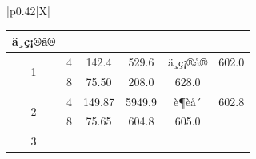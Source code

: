 \documentclass[UTF8,10pt,a4paper,fontset=fandol]{ctexart}
\newcommand{\fieldvalue}[1]{#1}
\newcommand{\handwritten}[1]{#1}
\begin{document}
\begin{center}
\begin{center}
\begin{tabularx}{\textwidth}{|p{}|X|}
{\begin{tabular}{|c|c|c|c|c|c|}
\fieldvalue{\handwritten{ä¸ç¡®å®}}
&\\
\hline
\multirow{2}{*}{1}
&
\fieldvalue{\handwritten{4}}
&
\fieldvalue{\handwritten{142.4}}
&
\fieldvalue{\handwritten{529.6}}
&
\fieldvalue{\handwritten{ä¸ç¡®å®}}
&
\fieldvalue{\handwritten{602.0}}\\
\cline{2-6}
&
\fieldvalue{\handwritten{8}}
&
\fieldvalue{\handwritten{75.50}}
&
\fieldvalue{\handwritten{208.0}}
&
\fieldvalue{\handwritten{628.0}}
&\\
\hline
\multirow{2}{*}{2}
&
\fieldvalue{\handwritten{4}}
&
\fieldvalue{\handwritten{149.87}}
&
\fieldvalue{\handwritten{5949.9}}
&
\fieldvalue{\handwritten{è¶èå´}}
&
\fieldvalue{\handwritten{602.8}}\\
\cline{2-6}
&
\fieldvalue{\handwritten{8}}
&
\fieldvalue{\handwritten{75.65}}
&
\fieldvalue{\handwritten{604.8}}
&
\fieldvalue{\handwritten{605.0}}
&\\
\hline
\multirow{2}{*}{3}
&

\end{tabular}}
\end{tabularx}
\end{center}
\end{center}
\end{document}
